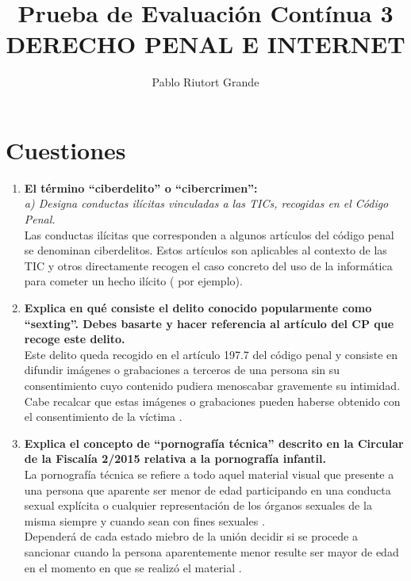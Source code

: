 \documentclass[10pt,a4paper]{article}
\author{Pablo Riutort Grande}
\title{Prueba de Evaluación Contínua 3\\ \vspace{1cm}\textbf{DERECHO PENAL E INTERNET}}
\begin{document}
\maketitle
\pagebreak
\section{Cuestiones}
\begin{enumerate}

\item \textbf{El término “ciberdelito” o “cibercrimen”:}\\
\textit{a) Designa conductas ilícitas vinculadas a las TICs, recogidas en el Código Penal.}\\
Las conductas ilícitas que corresponden a algunos artículos del código penal se denominan ciberdelitos. Estos artículos son aplicables al contexto de las TIC y otros directamente recogen el caso concreto del uso de la informática para cometer un hecho ilícito (\cite[Título XIII. Cap. VI. Art. 248.2.a]{cp} por ejemplo).

\item \textbf{Explica en qué consiste el delito conocido popularmente como “sexting”. Debes basarte y hacer referencia al artículo del CP que recoge este delito.}\\
Este delito queda recogido en el artículo 197.7 del código penal y consiste en difundir imágenes o grabaciones a terceros de una persona sin su consentimiento cuyo contenido pudiera menoscabar gravemente su intimidad. Cabe recalcar que estas imágenes o grabaciones pueden haberse obtenido con el consentimiento de la víctima \cite[Código Penal. Título X. Cap I. Art. 197.7]{cp}.

\item \textbf{Explica el concepto de “pornografía técnica” descrito en la Circular de la Fiscalía 2/2015
relativa a la pornografía infantil.}\\
La pornografía técnica se refiere a todo aquel material visual que presente a una persona que aparente ser menor de edad participando en una conducta sexual explícita o cualquier representación de los órganos sexuales de la misma siempre y cuando sean con fines sexuales \cite[Código Penal. Título VIII. Cap V. Art. 189.1.c)]{cp}.\\
Dependerá de cada estado miebro de la unión decidir si se procede a sancionar cuando la persona aparentemente menor resulte ser mayor de edad en el momento en que se realizó el material \cite[Art 5.7 de la Directiva 2011/93/UE]{dir}.


\end{enumerate}
\end{document}
